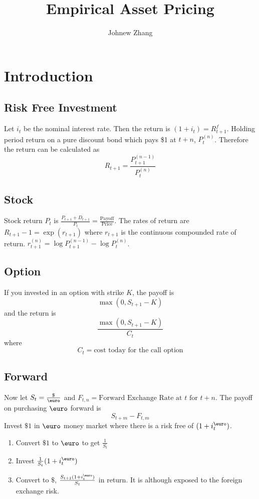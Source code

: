 \documentclass[11pt, a4paper, oneside]{article}
\title{Empirical Asset Pricing}
\author{Johnew Zhang}
\theoremstyle{definition}
\theoremstyle{proposition}
\theoremstyle{corollary}
\theoremstyle{lemma}
\theoremstyle{theorem}
\begin{document}
 

\def\angl#1{{%
\vbox{\hrule height .2pt 
\kern 1pt 
\hbox{$\scriptstyle {#1}\kern 1pt$}%
}\kern-.05pt \vrule width .2pt 
}} 

\def\tcelife#1{{\buildrel \circ \over e}_{#1}}

\maketitle

\hline

\tableofcontents
\addcontentsline 

\newpage

\section{Introduction}

\subsection{Risk Free Investment}
Let $i_t$ be the nominal interest rate. Then the return is $(1+i_t) = R_{t+1}^f$. Holding period return on a pure discount bond which pays \$1 at $t+n$, $P_t^{(n)}$. Therefore the return can be calculated as
$$R_{t+1} = \frac{P_{t+1}^{(n-1)}}{P_t^{(n)}}$$ 

\subsection{Stock}
Stock return $P_t$ is $\frac{P_{t+1} + D_{t+1}}{P_{t}} = \frac{\text{Payoff}}{\text{Price}}$. The rates of return are $R_{t+1} - 1 = \exp(r_{t+1})$ where $r_{t +1}$ is the continuous compounded rate of return.  $r_{t+1}^{(n)} = \log{P_{t+1}^{(n-1)}} - \log{P_t^{(n)}}$.

\subsection{Option}
If you invested in an option with strike $K$, the payoff is 
$$\max(0, S_{t+1} - K)$$ 
and the return is
$$\frac{\max(0, S_{t+1} - K)}{C_t }$$
where 
$$C_t =\text{cost today for the call option}$$
\subsection{Forward}
Now let $S_t = \frac{\$}{\text{\euro}}$ and $F_{t, n} = \text{Forward Exchange Rate at } t \text{ for } t + n$. The payoff on purchasing $\text{\euro}$ forward is 
$$S_{t+m} - F_{t, m}$$
Invest $\$1$ in $\text{\euro}$ money market where there is a risk free of $(1 + i_t^{\text{\euro}})$.
\begin{enumerate}
\item Convert $\$1$ to $\text{\euro}$ to get $\frac{1}{S_t}$
\item Invest $\frac{1}{S_t}(1+i_t^{\text{\euro}})$
\item Convert to $\$$, $\frac{S_{t+1}(1+ i_t^{\text{\euro}})}{S_t}$ in return. It is although exposed to the foreign exchange risk. 
\end{enumerate}
\end{document}
